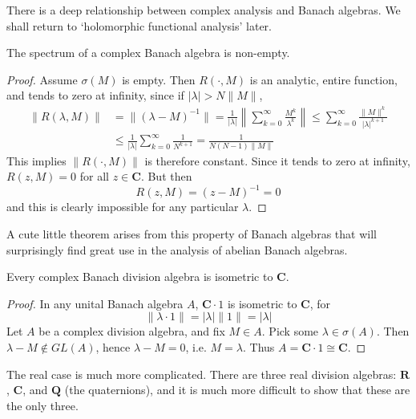 There is a deep relationship between complex analysis and Banach algebras. We shall return to `holomorphic functional analysis' later.

\begin{theorem}
    The spectrum of a complex Banach algebra is non-empty.
\end{theorem}
\begin{proof}
    Assume $\sigma(M)$ is empty. Then $R(\cdot, M)$ is an analytic, entire function, and tends to zero at infinity, since if $|\lambda| > N \| M \|$,
    \begin{align*}
        \| R(\lambda, M) \| &= \| (\lambda - M)^{-1} \| = \frac{1}{|\lambda|} \left\| \sum_{k = 0}^\infty \frac{M^k}{\lambda^k} \right\| \leq \sum_{k = 0}^\infty \frac{\| M \|^k}{|\lambda|^{k+1}}\\
        &\leq \frac{1}{|\lambda|} \sum_{k = 0}^\infty \frac{1}{N^{k+1}} = \frac{1}{N(N - 1)\|M\|}
    \end{align*}
    This implies $\| R(\cdot, M) \|$ is therefore constant. Since it tends to zero at infinity, $R(z, M) = 0$ for all $z \in \mathbf{C}$. But then
    \[ R(z, M) = (z - M)^{-1} = 0 \]
    and this is clearly impossible for any particular $\lambda$.
\end{proof}

A cute little theorem arises from this property of Banach algebras that will surprisingly find great use in the analysis of abelian Banach algebras.

\begin{corollary}
    Every complex Banach division algebra is isometric to $\mathbf{C}$.
\end{corollary}
\begin{proof}
    In any unital Banach algebra $A$, $\mathbf{C} \cdot 1$ is isometric to $\mathbf{C}$, for
    \[ \| \lambda \cdot 1 \| = |\lambda| \| 1 \| = |\lambda| \]
    Let $A$ be a complex division algebra, and fix $M \in A$. Pick some $\lambda \in \sigma(A)$. Then $\lambda - M \not \in GL(A)$, hence $\lambda - M = 0$, i.e. $M = \lambda$. Thus $A = \mathbf{C} \cdot 1 \cong \mathbf{C}$.
\end{proof}

The real case is much more complicated. There are three real division algebras: $\mathbf{R}$, $\mathbf{C}$, and $\mathbf{Q}$ (the quaternions), and it is much more difficult to show that these are the only three.

